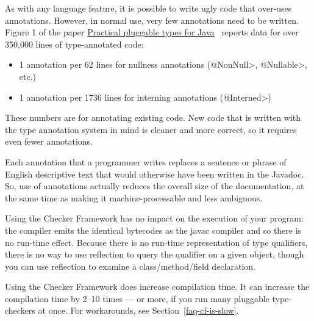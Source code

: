 As with any language feature, it is possible to write ugly code that
over-uses annotations.  However, in normal use, very few annotations need
to be written.  Figure 1 of the paper
\href{https://homes.cs.washington.edu/~mernst/pubs/pluggable-checkers-issta2008-abstract.html}{Practical
  pluggable types for Java}~\cite{PapiACPE2008} reports data for over
350,000 lines of type-annotated code:

\begin{itemize}
\item
    1 annotation per 62 lines for nullness annotations (\<@NonNull>, \<@Nullable>, etc.)
\item
    1 annotation per 1736 lines for interning annotations (\<@Interned>)
\end{itemize}


These numbers are for annotating existing code.  New code that
is written with the type annotation system in mind is cleaner and more
correct, so it requires even fewer annotations.

Each annotation that a programmer writes replaces a sentence or phrase of
English descriptive text that would otherwise have been written in the
Javadoc.  So, use of annotations actually reduces the overall size of the
documentation, at the same time as making it machine-processable
and less ambiguous.



Using the Checker Framework has no impact on the execution of your program:
the compiler emits the identical bytecodes as the javac
compiler and so there is no run-time effect.  Because there is no run-time
representation of type qualifiers, there is no way to use reflection to
query the qualifier on a given object, though you can use reflection to
examine a class/method/field declaration.

Using the Checker Framework does increase compilation time.
It can increase the compilation time by 2--10 times --- or more, if you run
many pluggable type-checkers at once.  For workarounds, see
Section~\ref{faq-cf-is-slow}.



